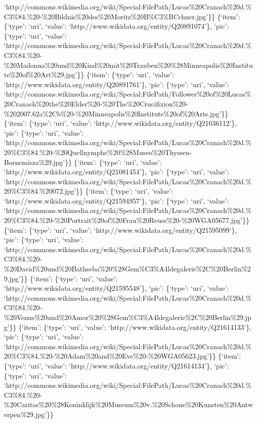 \documentclass[
  letterpaper,
]{book}
\begin{document}
`http://commons.wikimedia.org/wiki/Special:FilePath/Lucas\%20Cranach\%20d.\%C3\%84.\%20-\%20Bildnis\%20des\%20Moritz\%20B\%C3\%BCchner.jpg'\}\}
\{`item': \{`type': `uri', `value':
`http://www.wikidata.org/entity/Q20891074'\}, `pic': \{`type': `uri',
`value':
`http://commons.wikimedia.org/wiki/Special:FilePath/Lucas\%20Cranach\%20d.\%C3\%84.\%20-\%20Madonna\%20und\%20Kind\%20mit\%20Trauben\%20\%28Minneapolis\%20Institute\%20of\%20Art\%29.jpg'\}\}
\{`item': \{`type': `uri', `value':
`http://www.wikidata.org/entity/Q20891761'\}, `pic': \{`type': `uri',
`value':
`http://commons.wikimedia.org/wiki/Special:FilePath/Follower\%20of\%20Lucas\%20Cranach\%20the\%20Elder\%20-\%20The\%20Crucifixion\%20-\%202007.62a\%2Cb\%20-\%20Minneapolis\%20Institute\%20of\%20Arts.jpg'\}\}
\{`item': \{`type': `uri', `value':
`http://www.wikidata.org/entity/Q21036112'\}, `pic': \{`type': `uri',
`value':
`http://commons.wikimedia.org/wiki/Special:FilePath/Lucas\%20Cranach\%20d.\%20\%C3\%84.\%20-\%20Quellnymphe\%20\%28Museo\%20Thyssen-Bornemisza\%29.jpg'\}\}
\{`item': \{`type': `uri', `value':
`http://www.wikidata.org/entity/Q21081454'\}, `pic': \{`type': `uri',
`value':
`http://commons.wikimedia.org/wiki/Special:FilePath/Lucas\%20Cranach\%20d.\%20\%C3\%84.\%20072.jpg'\}\}
\{`item': \{`type': `uri', `value':
`http://www.wikidata.org/entity/Q21594957'\}, `pic': \{`type': `uri',
`value':
`http://commons.wikimedia.org/wiki/Special:FilePath/Lucas\%20Cranach\%20d.\%20\%C3\%84.\%20-\%20Portrait\%20of\%20Frau\%20Reuss\%20-\%20WGA05677.jpg'\}\}
\{`item': \{`type': `uri', `value':
`http://www.wikidata.org/entity/Q21595099'\}, `pic': \{`type': `uri',
`value':
`http://commons.wikimedia.org/wiki/Special:FilePath/Lucas\%20Cranach\%20d.\%C3\%84.\%20-\%20David\%20und\%20Bathseba\%20\%28Gem\%C3\%A4ldegalerie\%2C\%20Berlin\%29.jpg'\}\}
\{`item': \{`type': `uri', `value':
`http://www.wikidata.org/entity/Q21595548'\}, `pic': \{`type': `uri',
`value':
`http://commons.wikimedia.org/wiki/Special:FilePath/Lucas\%20Cranach\%20d.\%C3\%84.\%20-\%20Venus\%20und\%20Amor\%20\%28Gem\%C3\%A4ldegalerie\%2C\%20Berlin\%29.jpg'\}\}
\{`item': \{`type': `uri', `value':
`http://www.wikidata.org/entity/Q21614133'\}, `pic': \{`type': `uri',
`value':
`http://commons.wikimedia.org/wiki/Special:FilePath/Lucas\%20Cranach\%20d.\%20\%C3\%84.\%20-\%20Adam\%20and\%20Eve\%20-\%20WGA05623.jpg'\}\}
\{`item': \{`type': `uri', `value':
`http://www.wikidata.org/entity/Q21614134'\}, `pic': \{`type': `uri',
`value':
`http://commons.wikimedia.org/wiki/Special:FilePath/Lucas\%20Cranach\%20d.\%C3\%84.\%20-\%20Caritas\%20\%28Koninklijk\%20Museum\%20v.\%20Schone\%20Kunsten\%20Antwerpen\%29.jpg'\}\}
\end{document}
